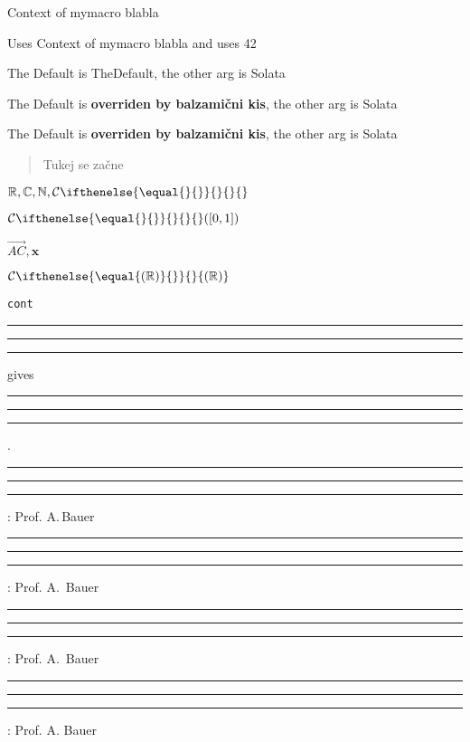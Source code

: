 \documentclass[a4paper]{article}
\newcommand{\mymacro}{Context of mymacro blabla}
\newcommand{\withargs}[2]{Uses #1 and uses #2}
\newcommand{\withdefvalues}[2][TheDefault]{The Default is #1, the other arg is #2}
\newcommand{\RR}{\mathbb{R}}
\newcommand{\CC}{\mathbb{C}}
\newcommand{\NN}{\mathbb{N}}
\newcommand{\cont}[1][{}]{\mathcal{C} \ifthenelse{\equal{#1}{}}{}{#1}}
\newcommand{\contOn}[2]{([#1,#2])}
\newcommand{\vectArrow}[1]{\overrightarrow{#1}}
\newcommand{\vect}[1]{\mathbf{#1}}
\newcommand{\cmd}[1]{\texttt{\color{blue}{\textbackslash}#1}}
\newcommand{\demolenght}[1]{\rule{0.1pt}{5pt}\rule{#1}{0.1pt}\rule{0.1pt}{5pt}}
\begin{document}
\mymacro{}

\withargs{\mymacro}{42}

\withdefvalues{Solata}

\withdefvalues[{\textbf{overriden by balzamični kis}}]{Solata}

\withdefvalues[{\textbf{overriden by balzamični kis}}]%
{Solata}

\begin{abstract}
    Tukej se začne    
\end{abstract}


$\RR{},\CC{},\NN{},\cont{}$

$\cont[]{} \contOn{0}{1}$

$\vectArrow{AC}, \vect{x}$

$\cont[(\RR)]$

\cmd{cont}

\demolenght{1em}
 gives \demolenght{6pt}.

 \demolenght{\widthof{\,}}: Prof. A.\,Bauer

 \demolenght{\widthof{\ }}: Prof. A.\ Bauer

 \demolenght{\widthof{~}}: Prof. A.~Bauer

 \demolenght{\widthof{ }}: Prof. A. Bauer
\end{document}
